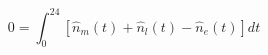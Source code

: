 \begin{equation}
0 = \int_{0}^{24}\left[\hat{n}_m(t) + \hat{n}_l(t) - \hat{n}_e(t)\right]dt
\label{ch4:equ:normal-distribution-balance}
\end{equation}
